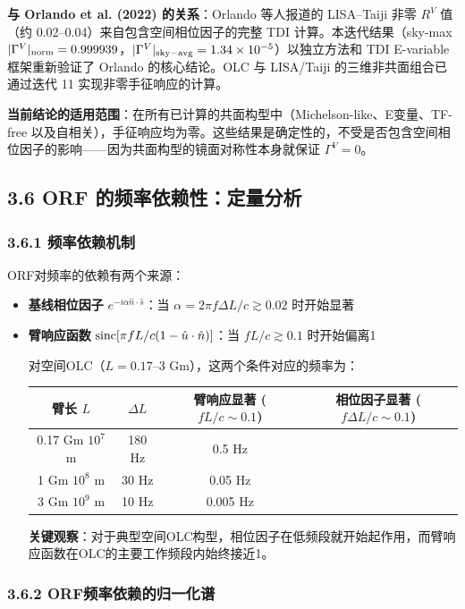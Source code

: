 \documentclass[12pt,a4paper]{article}
\begin{document}
\textbf{与 Orlando et al. (2022) 的关系}：Orlando 等人报道的 LISA--Taiji 非零 $R^V$ 值（约 0.02--0.04）来自包含空间相位因子的完整 TDI 计算。本迭代结果（sky-max $|\Gamma^V|_{\rm norm} = 0.999939$，$|\Gamma^V|_{\rm sky-avg} = 1.34 \times 10^{-5}$）以独立方法和 TDI E-variable 框架重新验证了 Orlando 的核心结论。OLC 与 LISA/Taiji 的三维非共面组合已通过迭代 11 实现非零手征响应的计算。

\textbf{当前结论的适用范围}：在所有已计算的共面构型中（Michelson-like、E变量、TF-free 以及自相关），手征响应均为零。这些结果是确定性的，不受是否包含空间相位因子的影响——因为共面构型的镜面对称性本身就保证 $\Gamma^V = 0$。

\subsection{3.6 ORF 的频率依赖性：定量分析}


\subsubsection{3.6.1 频率依赖机制}


ORF对频率的依赖有两个来源：

\begin{itemize}
  \item[1] \textbf{基线相位因子} $e^{-i\alpha \hat{n}\cdot\hat{s}}$：当 $\alpha = 2\pi f \Delta L / c \gtrsim 0.02$ 时开始显著
  \item[2] \textbf{臂响应函数} ${\rm sinc}[\pi f L/c(1-\hat{u}\cdot\hat{n})]$：当 $fL/c \gtrsim 0.1$ 时开始偏离1

对空间OLC（$L = 0.17$–3 Gm），这两个条件对应的频率为：

\begin{tabular}{|c|c|c|c|}
\hline
臂长 $L$ & $\Delta L$ & 臂响应显著 ($fL/c \sim 0.1$) & 相位因子显著 ($f\Delta L/c \sim 0.1$) \\
\hline
0.17 Gm $10^{7}$ m & 180 Hz & 0.5 Hz \\
1 Gm $10^{8}$ m & 30 Hz & 0.05 Hz \\
3 Gm $10^{9}$ m & 10 Hz & 0.005 Hz \\
\hline
\end{tabular}


\textbf{关键观察}：对于典型空间OLC构型，相位因子在低频段就开始起作用，而臂响应函数在OLC的主要工作频段内始终接近1。

\end{itemize}
\subsubsection{3.6.2 ORF频率依赖的归一化谱}
\end{document}
